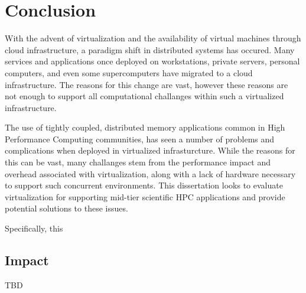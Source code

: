 
\chapter{Conclusion}
\label{chap:conc}


With the advent of virtualization and the availability of virtual machines through cloud infrastructure, a paradigm shift in distributed systems has occured. Many services and applications once deployed on workstations, private servers, personal computers, and even some supercomputers have migrated to a cloud infrastructure. The reasons for this change are vast, however these reasons are not enough to support all computational challanges within such a virtualized infrastructure.

The use of tightly coupled, distributed memory applications common in High Performance Computing communities, has seen a number of problems and complications when deployed in virtualized infrasturcture.  While the reasons for this can be vast, many challanges  stem from the performance impact and overhead associated with virtualization, along with a lack of hardware necessary to support such concurrent environments. This dissertation looks to evaluate virtualization for supporting mid-tier scientific HPC applications and provide potential solutions to these issues.  

Specifically, this   




\section{Impact}
\label{sec:impact}

TBD



